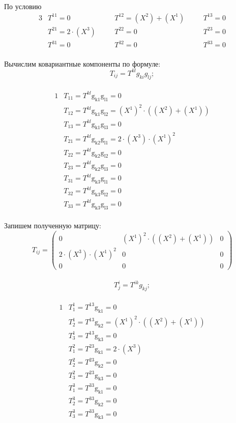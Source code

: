 \documentclass[a4paper, 12pt, oneside]{article}
\begin{document}
По условию\\
\begin{alignat*}{3}
  & T^{11} = 0 \quad &&T^{12} = (X^2) + (X^1) \quad &&T^{13} = 0 \\
  & T^{21} = 2\cdot (X^3) \quad &&T^{22} = 0 \quad &&T^{23} = 0 \\
  & T^{31} = 0 \quad &&T^{32} = 0 \quad &&T^{33} = 0 
\end{alignat*}\\
Вычислим ковариантные компоненты по формуле:\\
\[
T_{ij} = T^{kl}g_{ki}g_{lj};
\]\\
\begin{alignat*}{1}
  & T_{11} = T^{kl}\mathrm{g_{k1}g_{l1} = }0 \\
  & T_{12} = T^{kl}\mathrm{g_{k1}g_{l2} = }(X^1)^2\cdot ((X^2) + (X^1)) \\
  & T_{13} = T^{kl}\mathrm{g_{k1}g_{l3} = }0 \\
  & T_{21} = T^{kl}\mathrm{g_{k2}g_{l1} = }2\cdot (X^3)\cdot (X^1)^2 \\
  & T_{22} = T^{kl}\mathrm{g_{k2}g_{l2} = }0 \\
  & T_{23} = T^{kl}\mathrm{g_{k2}g_{l3} = }0 \\
  & T_{31} = T^{kl}\mathrm{g_{k3}g_{l1} = }0 \\
  & T_{32} = T^{kl}\mathrm{g_{k3}g_{l2} = }0 \\
  & T_{33} = T^{kl}\mathrm{g_{k3}g_{l3} = }0 
\end{alignat*}\\
Запишем полученную матрицу:\\
\[
T_{ij}=\begin{pmatrix}
	0 & (X^1)^2\cdot ((X^2) + (X^1)) & 0\\
	2\cdot (X^3)\cdot (X^1)^2 & 0 & 0\\
	0 & 0 & 0
\end{pmatrix}
\]\\
\[
T^i_j = T^{ik}g_{kj};
\]\\
\begin{alignat*}{1}
  & T^1_1 = T^{13}\mathrm{g_{k1} = }0 \\
  & T^1_2 = T^{13}\mathrm{g_{k2} = }(X^1)^2\cdot ((X^2) + (X^1)) \\
  & T^1_3 = T^{13}\mathrm{g_{k3} = }0 \\
  & T^2_1 = T^{23}\mathrm{g_{k1} = }2\cdot (X^3) \\
  & T^2_2 = T^{23}\mathrm{g_{k2} = }0 \\
  & T^2_3 = T^{23}\mathrm{g_{k3} = }0 \\
  & T^3_1 = T^{33}\mathrm{g_{k1} = }0 \\
  & T^3_2 = T^{33}\mathrm{g_{k2} = }0 \\
  & T^3_3 = T^{33}\mathrm{g_{k3} = }0 
\end{alignat*}\\
\end{document}

